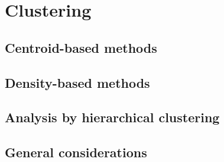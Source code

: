 \chapter{Clustering}
\label{ch:capitolo2}

\section{Centroid-based methods}\label{sec:centroid_based}


\section{Density-based methods}\label{sec:density_based}


\section{Analysis by hierarchical clustering}\label{sec:hierarchical}


\section{General considerations}\label{sec:considerations}